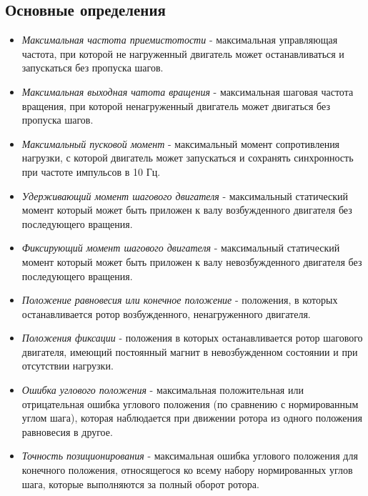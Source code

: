 \subsection{ Основные определения }

\begin{itemize}

    \item \textit{Максимальная частота приемистотости} - максимальная управляющая частота,
    при которой не нагруженный двигатель может останавливаться и запускаться без пропуска шагов.

    \item \textit{Максимальная выходная чатота вращения} - максимальная шаговая частота вращения,
    при которой ненагруженный двигатель может двигаться без пропуска шагов.

    \item \textit{Максимальный пусковой момент} - максимальный момент сопротивления нагрузки,
    с которой двигатель может запускаться и сохранять синхронность при частоте импульсов в 10 Гц.

    \item \textit{Удерживающий момент шагового двигателя} - максимальный статический момент
    который может быть приложен к валу возбужденного двигателя без последующего вращения.

    \item \textit{Фиксирующий момент шагового двигателя} - максимальный статический момент
    который может быть приложен к валу невозбужденного двигателя без последующего вращения.
    
    \item \textit{Положение равновесия или конечное положение} - положения, в которых
    останавливается ротор возбужденного, ненагруженного двигателя.
    
    \item \textit{Положения фиксации} - положения в которых останавливается ротор шагового
    двигателя, имеющий постоянный магнит в невозбужденном состоянии и при отсутствии нагрузки.

    \item \textit{Ошибка углового положения} - максимальная положительная или отрицательная ошибка
    углового положения (по сравнению с нормированным углом шага), которая наблюдается при движении
    ротора из одного положения равновесия в другое.
    
    \item \textit{Точность позиционирования} - максимальная ошибка углового положения для конечного
    положения, относящегося ко всему набору нормированных углов шага, которые выполняются за полный
    оборот ротора.
    
\end{itemize}


